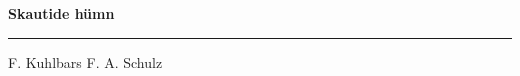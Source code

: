 \documentclass[10pt]{book}
\begin{document}
{
  \samepage
  \raggedbottom
  \raggedright
  \sloppy


  \vspace{0.2in}

  \noindent\begin{minipage}{.1\textwidth}
    \hfill\vspace{0.1in}
  \end{minipage}%
  \noindent\begin{minipage}{.8\textwidth}
    \centering
    \bfseries
    \large Skautide h\"umn
  \end{minipage}%
  \noindent\begin{minipage}{.1\textwidth}
      \hfill\vspace{0.1in}
  \end{minipage}

  \nopagebreak[4]
  \vspace{0.1in}
  \nopagebreak[4]
  \hrule height 0.05ex
  \nopagebreak[4]
  \vspace{-0.05in}

  {\footnotesize F. Kuhlbars \hfill F. A. Schulz }\\
  \vspace{0.01in}



}
\end{document}
